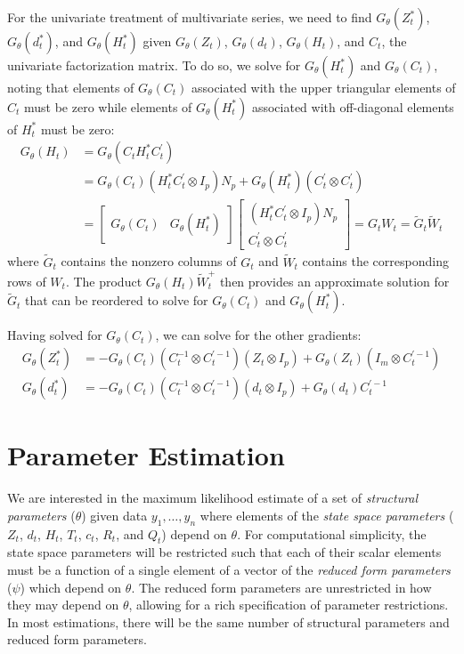 \documentclass[12pt]{article}
\newcommand{\Gt}{G_\theta}
\begin{document}
	For the univariate treatment of multivariate series, we need to find $\Gt(Z_t^*)$, $\Gt(d_t^*)$, and $\Gt(H_t^*)$ given $\Gt(Z_t)$, $\Gt(d_t)$, $\Gt(H_t)$, and $C_t$, the univariate factorization matrix. To do so, we  solve for $\Gt(H_t^*)$ and $\Gt(C_t)$, noting that elements of $\Gt(C_t)$ associated with the upper triangular elements of $C_t$ must be zero while elements of $\Gt(H_t^*)$ associated with off-diagonal elements of $H_t^*$ must be zero: 
	\begin{align*}
	\Gt(H_t) &= \Gt(C_t H_t^* C_t^\prime) \\
	&= \Gt(C_t)(H_t^* C_t^\prime \otimes I_p) N_p + \Gt(H_t^*)(C_t^\prime \otimes C_t^\prime) \\
	&= \begin{bmatrix} \Gt(C_t) & \Gt(H_t^*) \end{bmatrix} \begin{bmatrix} (H_t^* C_t^\prime \otimes I_p) N_p \\ C_t^\prime \otimes C_t^\prime \end{bmatrix} 
	= G_t W_t
	= \tilde{G}_t \tilde{W}_t
	\end{align*}
	where $\tilde{G}_t$ contains the nonzero columns of $G_t$ and $\tilde{W}_t$ contains the corresponding rows of $W_t$. The product $\Gt(H_t) \tilde{W}_t^+$ then provides an approximate solution for $\tilde{G}_t$ that can be reordered to solve for $\Gt(C_t)$ and $\Gt(H_t^*)$.

	Having solved for $\Gt(C_t)$, we can solve for the other gradients: 
	\begin{align*} 
	\Gt(Z_t^*) &= -\Gt(C_t)(C_t^{-1} \otimes C_t^{\prime-1})(Z_t \otimes I_p) + \Gt(Z_t)(I_m \otimes C_t^{\prime-1}) \\
	\Gt(d_t^*) &= -\Gt(C_t)(C_t^{-1} \otimes C_t^{\prime-1})(d_t \otimes I_p) + \Gt(d_t)C_t^{\prime-1}
	\end{align*}

\newpage
\section{Parameter Estimation}
	\label{sec:parameter_estimation}
	We are interested in the maximum likelihood estimate of a set of \emph{structural parameters} ($\theta$) given data $y_1, \dots, y_n$ where elements of the \emph{state space parameters} ($Z_t$, $d_t$, $H_t$, $T_t$, $c_t$, $R_t$, and $Q_t$) depend on $\theta$. For computational simplicity, the state space parameters will be restricted such that each of their scalar elements must be a function of a single element of a vector of the \emph{reduced form parameters} ($\psi$) which depend on $\theta$. The reduced form parameters are unrestricted in how they may depend on $\theta$, allowing for a rich specification of parameter restrictions. In most estimations, there will be the same number of structural parameters and reduced form parameters. 
\end{document}
